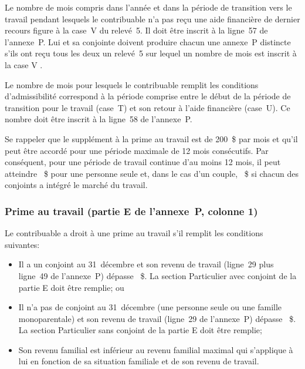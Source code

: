 Le nombre de mois compris dans l'année et dans la période de transition vers le travail pendant lesquels le contribuable n'a pas reçu une aide financière de dernier recours figure à la case~V du relevé~5. Il doit être inscrit à la ligne~57 de l'annexe~P. Lui et sa conjointe doivent produire chacun une annexe~P distincte s'ils ont reçu tous les deux un relevé~5 sur lequel un nombre de mois est inscrit à la case \og V \fg{}.

Le \og nombre de mois pour lesquels le contribuable remplit les conditions d'admissibilité \fg{} correspond à la période comprise entre le début de la période de transition pour le travail (case~T) et son retour à l'aide financière (case~U). Ce nombre doit être inscrit à la ligne~58 de l'annexe~P.

Se rappeler que le supplément à la prime au travail est de 200~\$ par mois et qu'il peut être accordé pour une période maximale de 12 mois consécutifs. Par conséquent, pour une période de travail continue d'au moins 12 mois, il peut atteindre ~\$ pour une personne seule et, dans le cas d'un couple, ~\$ si chacun des conjoints a intégré le marché du travail.

\subsubsection{Prime au travail (partie E de l'annexe~P, colonne 1)}
Le contribuable a droit à une prime au travail s'il remplit les conditions suivantes:
\begin{itemize}[label=]
	\item Il a un conjoint au 31~décembre et son revenu de travail (ligne~29 plus ligne~49 de l'annexe~P) dépasse ~\$. La section \og Particulier avec conjoint \fg{} de la partie E doit être remplie; ou
	\item Il n'a pas de conjoint au 31~décembre (une personne seule ou une famille monoparentale) et son revenu de travail (ligne~29 de l'annexe~P) dépasse ~\$. La section \og Particulier sans conjoint \fg{} de la partie E doit être remplie;
	\item Son revenu familial est inférieur au revenu familial maximal qui s'applique à lui en fonction de sa situation familiale et de son revenu de travail.
\end{itemize}

